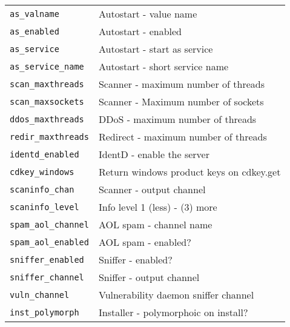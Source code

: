 \begin{table}[ht]
\begin{tabular}{ll}
		\verb|as_valname| & Autostart - value name\\
		\verb|as_enabled| & Autostart - enabled\\
		\verb|as_service| & Autostart - start as service\\
		\verb|as_service_name| & Autostart - short service name\\
		\verb|scan_maxthreads| & Scanner - maximum number of threads\\
		\verb|scan_maxsockets| & Scanner - Maximum number of sockets\\
		\verb|ddos_maxthreads| & DDoS - maximum number of threads\\
		\verb|redir_maxthreads| & Redirect - maximum number of threads\\
		\verb|identd_enabled| & IdentD - enable the server\\
		\verb|cdkey_windows| & Return windows product keys on cdkey.get\\
		\verb|scaninfo_chan| & Scanner - output channel\\
		\verb|scaninfo_level| & Info level 1 (less) - (3) more\\
		\verb|spam_aol_channel| & AOL spam - channel name\\
		\verb|spam_aol_enabled| & AOL spam - enabled?\\
		\verb|sniffer_enabled| & Sniffer - enabled?\\
		\verb|sniffer_channel| & Sniffer - output channel\\
		\verb|vuln_channel| & Vulnerability daemon sniffer channel\\
		\verb|inst_polymorph| & Installer - polymorphoic on install?\\\bottomrule
	\end{tabular}
\end{table}

